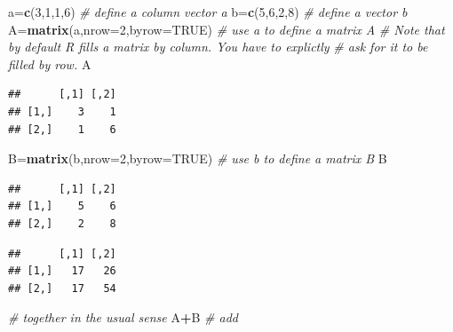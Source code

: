 \documentclass[]{book}
\newenvironment{Shaded}{\begin{snugshade}}{\end{snugshade}}
\newcommand{\CommentTok}[1]{\textcolor[rgb]{0.56,0.35,0.01}{\textit{#1}}}
\newcommand{\DataTypeTok}[1]{\textcolor[rgb]{0.13,0.29,0.53}{#1}}
\newcommand{\DecValTok}[1]{\textcolor[rgb]{0.00,0.00,0.81}{#1}}
\newcommand{\KeywordTok}[1]{\textcolor[rgb]{0.13,0.29,0.53}{\textbf{#1}}}
\newcommand{\NormalTok}[1]{#1}
\newcommand{\OperatorTok}[1]{\textcolor[rgb]{0.81,0.36,0.00}{\textbf{#1}}}
\newcommand{\OtherTok}[1]{\textcolor[rgb]{0.56,0.35,0.01}{#1}}
\theoremstyle{definition}
\theoremstyle{definition}
\theoremstyle{definition}
\theoremstyle{remark}
\begin{document}
\begin{Shaded}
\begin{Highlighting}[]
\NormalTok{a=}\KeywordTok{c}\NormalTok{(}\DecValTok{3}\NormalTok{,}\DecValTok{1}\NormalTok{,}\DecValTok{1}\NormalTok{,}\DecValTok{6}\NormalTok{)                     }\CommentTok{# define a column  vector a}
\NormalTok{b=}\KeywordTok{c}\NormalTok{(}\DecValTok{5}\NormalTok{,}\DecValTok{6}\NormalTok{,}\DecValTok{2}\NormalTok{,}\DecValTok{8}\NormalTok{)                     }\CommentTok{# define a  vector b}
\NormalTok{A=}\KeywordTok{matrix}\NormalTok{(a,}\DataTypeTok{nrow=}\DecValTok{2}\NormalTok{,}\DataTypeTok{byrow=}\OtherTok{TRUE}\NormalTok{)    }\CommentTok{# use a to define a matrix A}
\CommentTok{# Note that by default R fills a matrix by column. You have to explictly}
\CommentTok{# ask for it to be filled by row.}
\NormalTok{A}
\end{Highlighting}
\end{Shaded}

\begin{verbatim}
##      [,1] [,2]
## [1,]    3    1
## [2,]    1    6
\end{verbatim}

\begin{Shaded}
\begin{Highlighting}[]
\NormalTok{B=}\KeywordTok{matrix}\NormalTok{(b,}\DataTypeTok{nrow=}\DecValTok{2}\NormalTok{,}\DataTypeTok{byrow=}\OtherTok{TRUE}\NormalTok{)    }\CommentTok{# use b to define a matrix B}
\NormalTok{B}
\end{Highlighting}
\end{Shaded}

\begin{verbatim}
##      [,1] [,2]
## [1,]    5    6
## [2,]    2    8
\end{verbatim}

\begin{Shaded}
\end{Shaded}

\begin{verbatim}
##      [,1] [,2]
## [1,]   17   26
## [2,]   17   54
\end{verbatim}

\begin{Shaded}
\begin{Highlighting}[]
                                 \CommentTok{# together in the usual sense}
\NormalTok{A}\OperatorTok{+}\NormalTok{B                              }\CommentTok{# add}
\end{Highlighting}
\end{Shaded}
\end{document}
